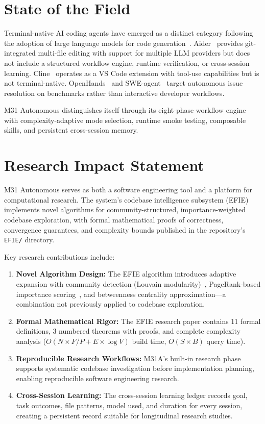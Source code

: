 \documentclass[11pt]{article}
\begin{document}
\section{State of the Field}

Terminal-native AI coding agents have emerged as a distinct category following the adoption of large language models for code generation~\cite{chen2021codex}. Aider~\cite{aider} provides git-integrated multi-file editing with support for multiple LLM providers but does not include a structured workflow engine, runtime verification, or cross-session learning. Cline~\cite{cline} operates as a VS Code extension with tool-use capabilities but is not terminal-native. OpenHands~\cite{openhands} and SWE-agent~\cite{sweagent} target autonomous issue resolution on benchmarks rather than interactive developer workflows.

M31 Autonomous distinguishes itself through its eight-phase workflow engine with complexity-adaptive mode selection, runtime smoke testing, composable skills, and persistent cross-session memory.

\section{Research Impact Statement}

M31 Autonomous serves as both a software engineering tool and a platform for computational research. The system's codebase intelligence subsystem (EFIE) implements novel algorithms for community-structured, importance-weighted codebase exploration, with formal mathematical proofs of correctness, convergence guarantees, and complexity bounds published in the repository's \texttt{EFIE/} directory.

Key research contributions include:

\begin{enumerate}
    \item \textbf{Novel Algorithm Design:} The EFIE algorithm introduces adaptive expansion with community detection (Louvain modularity)~\cite{blondel2008}, PageRank-based importance scoring~\cite{brin1998}, and betweenness centrality approximation---a combination not previously applied to codebase exploration.
    
    \item \textbf{Formal Mathematical Rigor:} The EFIE research paper contains 11 formal definitions, 3 numbered theorems with proofs, and complete complexity analysis ($O(N \times F / P + E \times \log V)$ build time, $O(S \times B)$ query time).
    
    \item \textbf{Reproducible Research Workflows:} M31A's built-in research phase supports systematic codebase investigation before implementation planning, enabling reproducible software engineering research.
    
    \item \textbf{Cross-Session Learning:} The cross-session learning ledger records goal, task outcomes, file patterns, model used, and duration for every session, creating a persistent record suitable for longitudinal research studies.
\end{enumerate}
\end{document}
